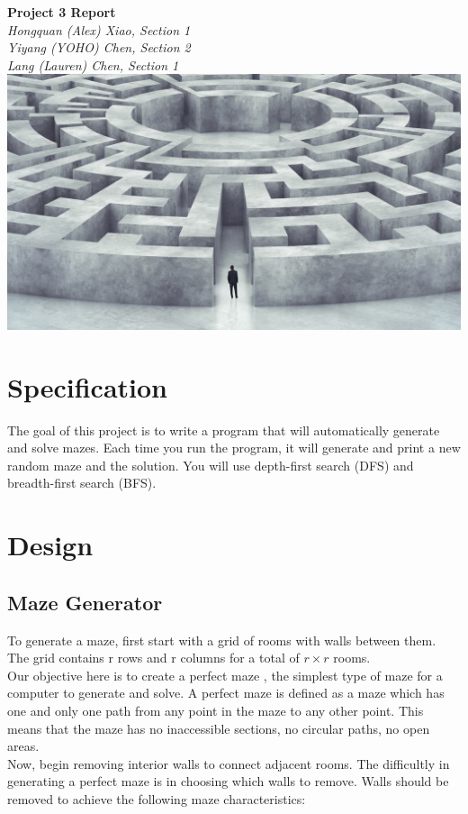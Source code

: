 \documentclass{article}
\begin{document}
\begin{titlepage}
	\begin{center}
		\huge\textbf{Project 3 Report}\\
		\vspace*{2\baselineskip}
		\large\textit{Hongquan (Alex) Xiao, Section 1} \\
		\large\textit{Yiyang (YOHO) Chen, Section 2} \\
		\large\textit{Lang (Lauren) Chen, Section 1} \\
		\vspace*{3\baselineskip}
		\includegraphics[scale=0.4]{maze_title.jpg} 
	\end{center}
\end{titlepage}


\section{Specification}
The goal of this project is to write a program that will automatically generate and solve mazes. Each time you run the program, it will generate and print a new random maze and the solution. You will use depth-first search (DFS) and breadth-first search (BFS). 

\section{Design}

\subsection*{Maze Generator}
To generate a maze, first start with a grid of rooms with walls between them. The grid contains r rows and r columns for a total of $r \times r$ rooms. \\
Our objective here is to create a perfect maze , the simplest type of maze for a computer to generate and solve. A perfect maze is defined as a maze which has one and only one path from any point in the maze to any other point. This means that the maze has no inaccessible sections, no circular paths, no open areas. \\
Now, begin removing interior walls to connect adjacent rooms. The difficultly in generating a perfect maze is in choosing which walls to remove. Walls should be removed to achieve the following maze characteristics:
\end{document}
